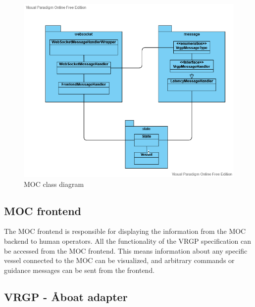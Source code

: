 \begin{figure}[ht]
	\centering
	\includegraphics[width=\linewidth]{diagrams/ClassDiagramMOC}
	\caption{MOC class diagram}
	\label{fig:moc-class-diagram}
\end{figure}

\subsection{MOC frontend}

The MOC frontend is responsible for displaying the information from the MOC backend to human operators. All the functionality of the VRGP specification can be accessed from the MOC frontend. This means information about any specific vessel connected to the MOC can be visualized, and arbitrary commands or guidance messages can be sent from the frontend.

\subsection{VRGP - Åboat adapter}

